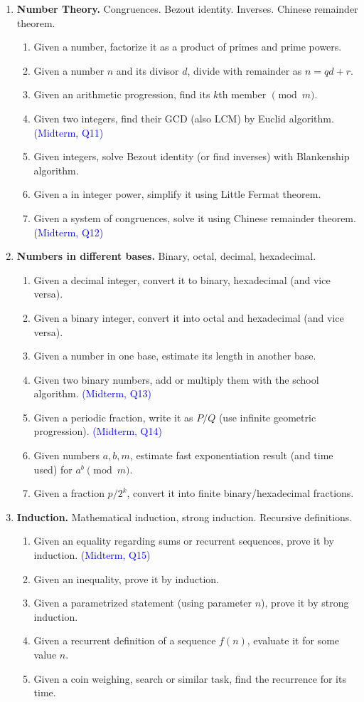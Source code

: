 \documentclass[a4paper,12pt]{article}
\begin{document}
{\begin{enumerate}
\begin{enumerate}
\end{enumerate}
\item \textbf{Number Theory.} Congruences. Bezout identity. Inverses. Chinese remainder theorem.
\begin{enumerate}
\item Given a number, factorize it as a product of primes and prime powers.
\item Given a number $n$ and its divisor $d$, divide with remainder as $n = qd + r$. 
\item Given an arithmetic progression, find its $k$th member $\pmod{m}$.
\item Given two integers, find their GCD (also LCM) by Euclid algorithm. \textcolor{blue}{(Midterm, Q11)}
\item Given integers, solve Bezout identity (or find inverses) with Blankenship algorithm.
\item Given a in integer power, simplify it using Little Fermat theorem.
\item Given a system of congruences, solve it using Chinese remainder theorem. \textcolor{blue}{(Midterm, Q12)}
\end{enumerate}
\item \textbf{Numbers in different bases.} Binary, octal, decimal, hexadecimal.
\begin{enumerate}
\item Given a decimal integer, convert it to binary, hexadecimal (and vice versa).
\item Given a binary integer, convert it into octal and hexadecimal (and vice versa).
\item Given a number in one base, estimate its length in another base.
\item Given two binary numbers, add or multiply them with the school algorithm.  \textcolor{blue}{(Midterm, Q13)}
\item Given a periodic fraction, write it as $P/Q$ (use infinite geometric progression).  \textcolor{blue}{(Midterm, Q14)}
\item Given numbers $a,b,m$, estimate fast exponentiation result (and time used) for $a^b \pmod{m}$.
\item Given a fraction $p/2^k$, convert it into finite binary/hexadecimal fractions.
\end{enumerate}
\item \textbf{Induction.} Mathematical induction, strong induction. Recursive definitions.
\begin{enumerate}
\item Given an equality regarding sums or recurrent sequences, prove it by induction. \textcolor{blue}{(Midterm, Q15)}
\item Given an inequality, prove it by induction. 
\item Given a parametrized statement (using parameter $n$), prove it by strong induction. 
\item Given a recurrent definition of a sequence $f(n)$, evaluate it for some value $n$.
\item Given a coin weighing, search or similar task, find the recurrence for its time.
\end{enumerate}
\end{enumerate}
}
\end{document}
